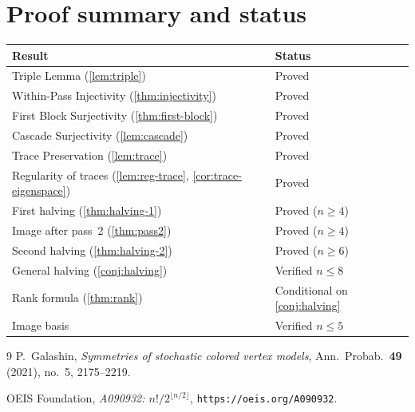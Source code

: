 \documentclass[11pt]{article}
\theoremstyle{definition}
\theoremstyle{remark}
\begin{document}
\section{Proof summary and status}

\begin{center}
\begin{tabular}{l|l}
\textbf{Result} & \textbf{Status} \\
\hline
Triple Lemma (\ref{lem:triple}) & Proved \\
Within-Pass Injectivity (\ref{thm:injectivity}) & Proved \\
First Block Surjectivity (\ref{thm:first-block}) & Proved \\
Cascade Surjectivity (\ref{lem:cascade}) & Proved \\
Trace Preservation (\ref{lem:trace}) & Proved \\
Regularity of traces (\ref{lem:reg-trace}, \ref{cor:trace-eigenspace})
  & Proved \\
First halving (\ref{thm:halving-1}) & Proved ($n \ge 4$) \\
Image after pass~2 (\ref{thm:pass2}) & Proved ($n \ge 4$) \\
Second halving (\ref{thm:halving-2}) & Proved ($n \ge 6$) \\
General halving (\ref{conj:halving}) & Verified $n \le 8$ \\
Rank formula (\ref{thm:rank}) & Conditional on \ref{conj:halving} \\
Image basis & Verified $n \le 5$ \\
\end{tabular}
\end{center}


\begin{thebibliography}{9}
P.~Galashin, \emph{Symmetries of stochastic colored vertex models},
Ann.\ Probab.\ \textbf{49} (2021), no.~5, 2175--2219.

OEIS Foundation, \emph{A090932: $n!/2^{\lfloor n/2\rfloor}$},
\texttt{https://oeis.org/A090932}.
\end{thebibliography}
\end{document}
